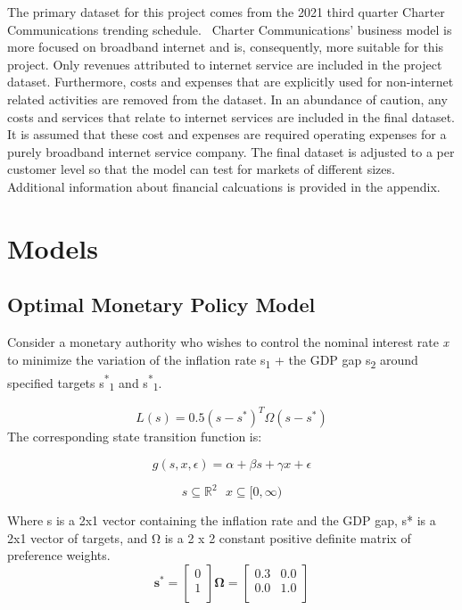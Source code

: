 \documentclass[a4paper,oneside]{article}
\begin{document}
\:\:\:\:\:\: The primary dataset for this project comes from the 2021 third quarter Charter Communications trending schedule.~\citep{chtr_rep} 
Charter Communications' business model is more focused on broadband internet and is, consequently, more suitable for this project.
Only revenues attributed to internet service are included in the project dataset. 
Furthermore, costs and expenses that are explicitly used for non-internet related activities are removed from the dataset.
In an abundance of caution, any costs and services that relate to internet services are included in the final dataset. 
It is assumed that these cost and expenses are required operating expenses for a purely broadband internet service company.
The final dataset is adjusted to a per customer level so that the model can test for markets of different sizes.
Additional information about financial calcuations is provided in the appendix.

\section{Models}
\subsection{Optimal Monetary Policy Model}

\:\:\:\:\:\:\:\:Consider a monetary authority who wishes to control the nominal interest rate  \emph{x} to minimize the variation of the inflation rate s\textsubscript{1} + the GDP gap s\textsubscript{2} around specified targets s\textsuperscript{*}\textsubscript{1} and s\textsuperscript{*}\textsubscript{1}.

\begin{equation}
	L(s) = 0.5(s-s^{*})^{T}\Omega(s-s^{*})
	\label{eq:mye1}
\end{equation} 
The corresponding state transition function is: 

\begin{equation}
	g(s,x,\epsilon) = \alpha + \beta s + \gamma x + \epsilon
	\label{eq:myeq2}
\end{equation} 

\begin{equation*}
s \subseteq \mathbb{R}^{2} \:\:\:	
x \subseteq [0, \infty)
\end{equation*}

Where s is a 2x1 vector containing the inflation rate and the GDP gap, s* is a 2x1 vector of targets, and Ω is a 2 x 2 constant positive definite matrix of preference weights. 
\begin{equation*} %
	\bm{s^{*}} = 
		\left.
			\begin{bmatrix}
				0	\\
				1	\\
			\end{bmatrix}
		\right.
	\bm{\Omega} = 
		\left.
			\begin{bmatrix}
				0.3	&	0.0\\
				0.0	&	1.0\\
			\end{bmatrix}
		\right.
\end{equation*}
\end{document}
